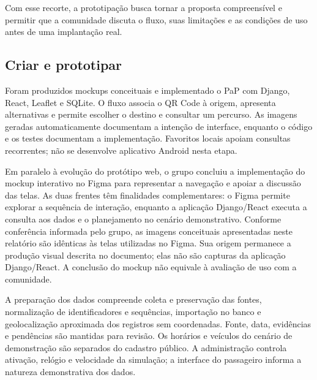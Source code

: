 \documentclass[12pt,oneside,a4paper,brazil]{abntex2}
\begin{document}
Com esse recorte, a prototipação busca tornar a proposta compreensível e permitir que a comunidade discuta o fluxo, suas limitações e as condições de uso antes de uma implantação real.

\subsection{Criar e prototipar}
Foram produzidos mockups conceituais e implementado o PaP com Django, React, Leaflet e SQLite. O fluxo associa o QR Code à origem, apresenta alternativas e permite escolher o destino e consultar um percurso. As imagens geradas automaticamente documentam a intenção de interface, enquanto o código e os testes documentam a implementação. Favoritos locais apoiam consultas recorrentes; não se desenvolve aplicativo Android nesta etapa.

Em paralelo à evolução do protótipo web, o grupo concluiu a implementação do mockup interativo no Figma para representar a navegação e apoiar a discussão das telas. As duas frentes têm finalidades complementares: o Figma permite explorar a sequência de interação, enquanto a aplicação Django/React executa a consulta aos dados e o planejamento no cenário demonstrativo. Conforme conferência informada pelo grupo, as imagens conceituais apresentadas neste relatório são idênticas às telas utilizadas no Figma. Sua origem permanece a produção visual descrita no documento; elas não são capturas da aplicação Django/React. A conclusão do mockup não equivale à avaliação de uso com a comunidade.

A preparação dos dados compreende coleta e preservação das fontes, normalização de identificadores e sequências, importação no banco e geolocalização aproximada dos registros sem coordenadas. Fonte, data, evidências e pendências são mantidas para revisão. Os horários e veículos do cenário de demonstração são separados do cadastro público. A administração controla ativação, relógio e velocidade da simulação; a interface do passageiro informa a natureza demonstrativa dos dados.
\end{document}
